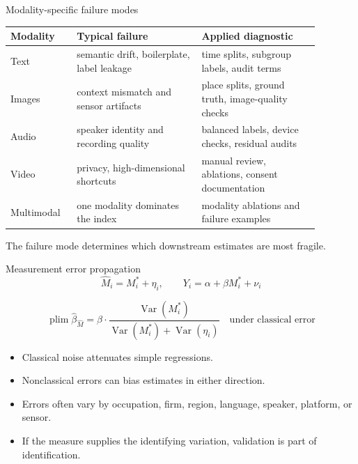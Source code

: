 \documentclass[aspectratio=169,11pt]{beamer}
\newcommand{\1}{\mathbf{1}}
\newcommand{\plim}{\operatorname{plim}}
\begin{document}
\begin{frame}{Modality-specific failure modes}
\small
\begin{tabular}{p{0.18\linewidth} p{0.36\linewidth} p{0.34\linewidth}}
\toprule
Modality & Typical failure & Applied diagnostic \\
\midrule
Text & semantic drift, boilerplate, label leakage & time splits, subgroup labels, audit terms \\
Images & context mismatch and sensor artifacts & place splits, ground truth, image-quality checks \\
Audio & speaker identity and recording quality & balanced labels, device checks, residual audits \\
Video & privacy, high-dimensional shortcuts & manual review, ablations, consent documentation \\
Multimodal & one modality dominates the index & modality ablations and failure examples \\
\bottomrule
\end{tabular}

\medskip
The failure mode determines which downstream estimates are most fragile.
\end{frame}

\begin{frame}{Measurement error propagation}
\small
\[
\widehat M_i=M_i^*+\eta_i,
\qquad
Y_i=\alpha+\beta M_i^*+\nu_i
\]

\[
\plim \widehat\beta_{\widehat M}
=
\beta
\cdot
\frac{\operatorname{Var}(M_i^*)}
{\operatorname{Var}(M_i^*)+\operatorname{Var}(\eta_i)}
\quad
\text{under classical error}
\]

\begin{itemize}
    \item Classical noise attenuates simple regressions.
    \item Nonclassical errors can bias estimates in either direction.
    \item Errors often vary by occupation, firm, region, language, speaker, platform, or sensor.
    \item If the measure supplies the identifying variation, validation is part of identification.
\end{itemize}
\end{frame}
\end{document}
